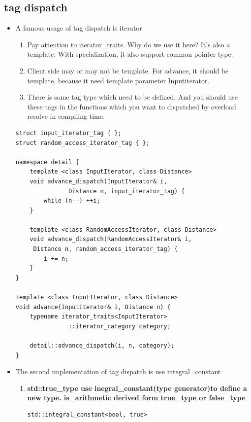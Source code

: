 \documentclass[a4paper,11pt,twoside]{book}
\begin{document}
\subsection{tag dispatch}
\begin{itemize}
	\item A famous usage of tag dispatch is iterator 
	\begin{enumerate}
		\item Pay attention to iterator\_traits. Why do we use it here? It's also a template. With specialization, it also support common pointer type.
		
		\item Client side may or may not be template. For advance, it should be template, because it need template parameter Inputiterator.
		
		\item There is some tag type which need to be defined. And you should use these tags in the functions which you want to dispatched by overload resolve in compiling time. 
	\end{enumerate}
\begin{lstlisting}[numbers=none]
struct input_iterator_tag { };
struct random_access_iterator_tag { };
	
namespace detail {
	template <class InputIterator, class Distance>
	void advance_dispatch(InputIterator& i, 
	           Distance n, input_iterator_tag) {
		while (n--) ++i;
	}
		
	template <class RandomAccessIterator, class Distance>
	void advance_dispatch(RandomAccessIterator& i,
	 Distance n, random_access_iterator_tag) {
		i += n;
	}
}
	
template <class InputIterator, class Distance>
void advance(InputIterator& i, Distance n) {
	typename iterator_traits<InputIterator>
	           ::iterator_category category;
	                   
	detail::advance_dispatch(i, n, category);
}
\end{lstlisting}
	
	\item The second implementation of tag dispatch is use integral\_constant
	\begin{enumerate}
		\item \textbf{std::true\_type use inegral\_constant(type generator)to define a new type. is\_arithmetic derived form true\_type or false\_type}
\begin{lstlisting}[numbers=none]
std::integral_constant<bool, true>
		

\end{lstlisting}
\end{enumerate}
\end{itemize}
\end{document}
